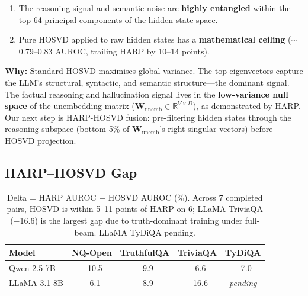 \documentclass[11pt,a4paper]{article}
\begin{document}
\begin{enumerate}
  \item The reasoning signal and semantic noise are \textbf{highly entangled}
        within the top 64 principal components of the hidden-state space.
  \item Pure HOSVD applied to raw hidden states has a \textbf{mathematical
        ceiling} ($\sim$0.79--0.83 AUROC, trailing HARP by 10--14 points).
\end{enumerate}

\noindent
\textbf{Why:} Standard HOSVD maximises global variance.  The top eigenvectors
capture the LLM's structural, syntactic, and semantic structure---the
dominant signal.  The factual reasoning and hallucination signal lives in
the \textbf{low-variance null space} of the unembedding matrix
($\mathbf{W}_{\text{unemb}} \in \mathbb{R}^{V \times D}$), as demonstrated
by HARP.  Our next step is HARP-HOSVD fusion: pre-filtering hidden states
through the reasoning subspace (bottom 5\% of $\mathbf{W}_{\text{unemb}}$'s
right singular vectors) before HOSVD projection.

\subsection{HARP--HOSVD Gap}

\begin{table}[h]
\centering
\begin{tabular}{lcccc}
\toprule
\textbf{Model} & \textbf{NQ-Open} & \textbf{TruthfulQA} & \textbf{TriviaQA} & \textbf{TyDiQA} \\
\midrule
Qwen-2.5-7B   & $-$10.5 & $-$9.9 & $-$6.6 & $-$7.0 \\
LLaMA-3.1-8B  & $-$6.1  & $-$8.9 & $-$16.6 & \textit{pending} \\
\bottomrule
\end{tabular}
\caption{Delta = HARP AUROC $-$ HOSVD AUROC (\%).  Across 7 completed pairs,
         HOSVD is within 5--11 points of HARP on 6; LLaMA TriviaQA ($-$16.6)
         is the largest gap due to truth-dominant training under full-beam.
         LLaMA TyDiQA pending.}
\end{table}
\end{document}
